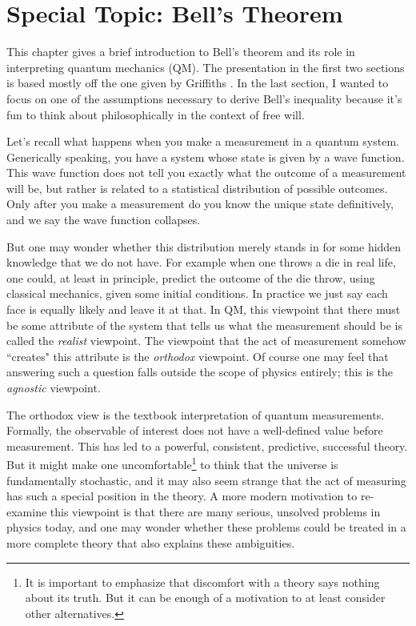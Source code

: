 \chapter{Special Topic: Bell's Theorem}\label{ap:bell}

This chapter gives a brief introduction to Bell's theorem and its role in
interpreting quantum mechanics (QM). The presentation in the first two sections
is based mostly off the one given by Griffiths 
\cite{griffiths_introduction_2005}. In the last section, I wanted to focus
on one of the assumptions necessary to derive Bell's inequality because
it's fun to think about philosophically in the context of free will.

Let's recall what happens when you make a measurement in a quantum system.
Generically speaking, you have a system whose state is given by a wave
function. This wave function does not tell you exactly what the
outcome of a measurement will be, but rather is related to a statistical
distribution of possible outcomes. Only after you make a measurement do
you know the unique state definitively, and we say the wave function collapses.

But one may wonder whether this distribution merely stands in for some
hidden knowledge that we do not have. For example when one throws a die
in real life, one could, at least in principle, predict the outcome of
the die throw, using classical mechanics, given some initial conditions.
In practice we just say each face is equally likely and leave it at that.
In QM, this viewpoint that there must be some attribute
of the system that tells us what the measurement should be is called
the {\it realist} viewpoint. The viewpoint that the act of measurement
somehow ``creates" this attribute is the {\it orthodox} viewpoint.
Of course one may feel that answering such a question falls outside the
scope of physics entirely; this is the {\it agnostic} viewpoint.

The orthodox view is the textbook interpretation of quantum
measurements. Formally, the observable of interest does not have a
well-defined value before measurement. This has led to a powerful,
consistent, predictive, successful theory. But it might make one 
uncomfortable\footnote{It is important to emphasize that discomfort
with a theory says nothing about its truth. But it can be enough of
a motivation to at least consider other alternatives.} to
think that the universe is fundamentally stochastic, and it
may also seem strange that the act of measuring has such a special
position in the theory. A more modern motivation to re-examine this
viewpoint is that there are many serious, unsolved problems in physics today,
and one may wonder whether these problems could be treated in a
more complete theory that also explains these ambiguities.

